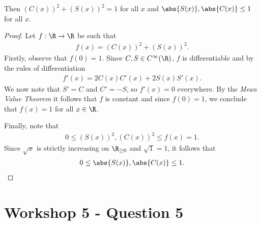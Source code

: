 \documentclass{article}
\begin{document}
\begin{claim*}
   Then $(C(x))^2 + (S(x))^2 = 1$ for all $x$ and $\abs{S(x)},\abs{C(x)}\leq 1$ 
   for all $x$.
\end{claim*}

\begin{proof}
   Let $f:\R\to\R$ be such that 
   \begin{align*}
      f(x) = (C(x))^2 + (S(x))^2.
   \end{align*}
   Firstly, observe that $f(0)=1$.
   Since $C,S\in C^\infty(\R)$, $f$ is differentiable and by the rules of differentiation
   \begin{align*}
      f'(x) = 2C(x)C'(x) + 2S(x)S'(x).
   \end{align*}
   We now note that $S'=C$ and $C'=-S$, so $f'(x)=0$ everywhere. By the \emph{Mean Value Theorem}
   it follows that $f$ is constant and since $f(0)=1$, we conclude that $f(x)=1$ for all $x\in\R$.

   Finally, note that 
   \begin{align*}
      0 \leq (S(x))^2, (C(x))^2 \leq f(x) = 1.
   \end{align*}
   Since $\sqrt{x}$ is strictly increasing on $\R_{\geq 0}$ and $\sqrt{1}=1$, it follows that 
   \begin{align*}
      0 \leq \abs{S(x)}, \abs{C(x)} \leq 1.
   \end{align*}
\end{proof}

\section*{Workshop 5 - Question 5}
\end{document}
